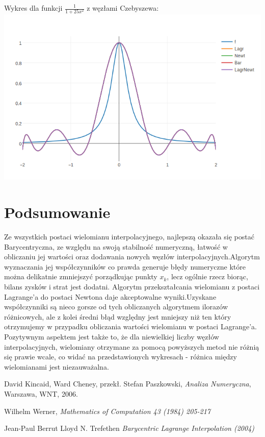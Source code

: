 \documentclass[11pt,wide]{article}
\begin{document}
\begin{center}
Wykres dla funkcji $\frac{1}{1 + 25x^2}$ z węzłami Czebyszewa: \newline
\includegraphics[scale = 0.55]{rungech}

\end{center}

\section{Podsumowanie}
Ze wszystkich postaci wielomianu interpolacyjnego, najlepszą okazała się postać Barycentryczna, ze względu na swoją stabilność numeryczną, łatwość w obliczaniu jej wartości oraz dodawania nowych węzłów interpolacyjnych.Algorytm wyznaczania jej współczynników co prawda generuje błędy numeryczne które można delikatnie zmniejszyć porządkując punkty $x_k$, lecz ogólnie rzecz biorąc, bilans zysków i strat jest dodatni.\newline\noindent
Algorytm przekształcania wielomianu z postaci Lagrange'a do postaci Newtona daje akceptowalne wyniki.Uzyskane współczynniki są nieco gorsze od tych obliczanych algorytmem ilorazów różnicowych, ale z kolei średni błąd względny jest mniejszy niż ten który otrzymujemy w przypadku obliczania wartości wielomianu w postaci Lagrange'a.\newline
Pozytywnym aspektem jest także to, że dla niewielkiej liczby węzłów interpolacyjnych, wielomiany otrzymane za pomocą powyższych metod nie różnią się prawie wcale, co widać na przedstawionych wykresach - różnica między wielomianami jest niezauważalna.

\begin{thebibliography}{10}
  David Kincaid, Ward Cheney,
  przekł. Stefan Paszkowski,
  \emph{Analiza Numeryczna},
  Warszawa, WNT, 2006.
  
 Wilhelm Werner,
 \emph{Mathematics of Computation 43 (1984) 205-217}
 
 Jean-Paul Berrut
 Lloyd N. Trefethen
 \emph{Barycentric Lagrange Interpolation (2004)}
\end{thebibliography}
\end{document}
